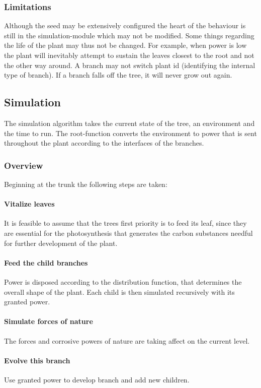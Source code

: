 \subsubsection{Limitations}
Although the seed may be extensively configured the heart of the behaviour is
still in the simulation-module which may not be modified. Some things regarding
the life of the plant may thus not be changed. For example, when power is low
the plant will inevitably attempt to sustain the leaves closest to the root and
not the other way around. A branch may not switch plant id (identifying the
internal type of branch). If a branch falls off the tree, it will never grow out
again.

\subsection{Simulation}
The simulation algorithm takes the current state of the tree, an environment
and the time to run. The root-function converts the environment to power that
is sent throughout the plant according to the interfaces of the branches.
\subsubsection{Overview}
Beginning at the trunk the following steps are taken:
\paragraph{Vitalize leaves} 
It is feasible to assume that the trees first priority is to feed its leaf,
since they are essential for the photosynthesis that generates the carbon
substances needful for further development of the plant.
\paragraph{Feed the child branches} 
Power is disposed according to the distribution
function, that determines the overall shape of the plant. Each child is then
simulated recursively with its granted power.
\paragraph{Simulate forces of nature} 
The forces and corrosive powers of nature are taking affect on the current
level.
\paragraph{Evolve this branch}
Use granted power to develop branch and add new
children.


